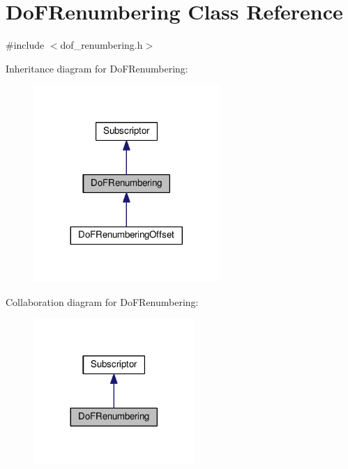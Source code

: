 \hypertarget{class_do_f_renumbering}{}\section{Do\+F\+Renumbering Class Reference}
\label{class_do_f_renumbering}


{\ttfamily \#include $<$dof\+\_\+renumbering.\+h$>$}



Inheritance diagram for Do\+F\+Renumbering\+:\nopagebreak
\begin{figure}[H]
\begin{center}
\leavevmode
\includegraphics[width=200pt]{class_do_f_renumbering__inherit__graph}
\end{center}
\end{figure}


Collaboration diagram for Do\+F\+Renumbering\+:\nopagebreak
\begin{figure}[H]
\begin{center}
\leavevmode
\includegraphics[width=173pt]{class_do_f_renumbering__coll__graph}
\end{center}
\end{figure}
